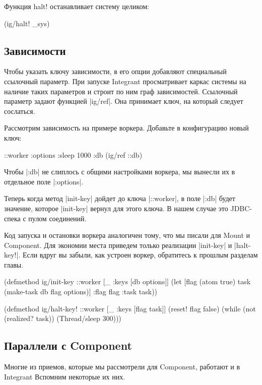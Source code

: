 Функция halt! останавливает систему целиком:

\begin{code}
(ig/halt! _sys)
\end{code}

\subsection{Зависимости}

Чтобы указать ключу зависимости, в его опции добавляют специальный ссылочный
параметр. При запуске Integrant просматривает каркас системы на наличие таких
параметров и строит по ним граф зависимостей. Ссылочный параметр задают функцией
\spverb|ig/ref|. Она принимает ключ, на который следует сослаться.

Рассмотрим зависимость на примере воркера. Добавьте в конфигурацию новый ключ:

\begin{code}
{::worker {:options {:sleep 1000}
           :db (ig/ref ::db)}}
\end{code}

Чтобы \spverb|:db| не слиплось с общими настройками воркера, мы вынесли их в отдельное
поле \spverb|:options|.

Теперь когда метод \spverb|init-key| дойдет до ключа \spverb|::worker|, в поле \spverb|:db| будет
значение, которое \spverb|init-key| вернул для этого ключа. В нашем случае это
JDBC-спека с пулом соединений.

Код запуска и остановки воркера аналогичен тому, что мы писали для Mount и
Component. Для экономии места приведем только реализации \spverb|init-key| и
\spverb|halt-key!|. Если вдруг вы забыли, как устроен воркер, обратитесь к прошлым
разделам главы.

\begin{code}
(defmethod ig/init-key ::worker
  [_ {:keys [db options]}]
  (let [flag (atom true)
        task (make-task db flag options)]
    {:flag flag :task task}))

(defmethod ig/halt-key! ::worker
  [_ {:keys [flag task]}]
  (reset! flag false)
  (while (not (realized? task))
    (Thread/sleep 300)))
\end{code}

\subsection{Параллели с Component}

Многие из приемов, которые мы рассмотрели для Component, работают и в Integrant
Вспомним некоторые их них.

